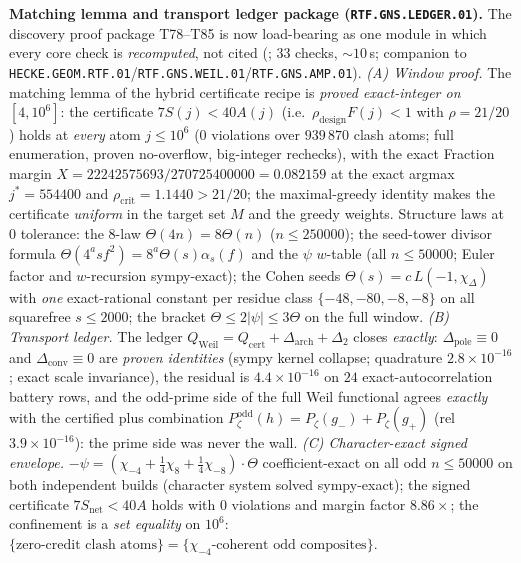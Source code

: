 \par\smallskip\noindent\textbf{Matching lemma and transport ledger package
(\texttt{RTF.GNS.LEDGER.01}).}
The discovery proof package T78--T85 is now load-bearing as one module in which
every core check is \emph{recomputed}, not cited
(; $33$ checks, $\sim10$\,s; companion to
\texttt{HECKE.GEOM.RTF.01}/\texttt{RTF.GNS.WEIL.01}/\texttt{RTF.GNS.AMP.01}).
\emph{(A) Window proof.} The matching lemma of the hybrid certificate recipe is
\emph{proved exact-integer on $[4,10^6]$}: the certificate $7S(j)<40A(j)$
(i.e.\ $\rho_{\mathrm{design}}F(j)<1$ with $\rho=21/20$) holds at \emph{every}
atom $j\le10^6$ ($0$ violations over $939\,870$ clash atoms; full enumeration,
proven no-overflow, big-integer rechecks), with the exact Fraction margin
$X=22242575693/270725400000=0.082159$ at the exact argmax $j^*=554400$ and
$\rho_{\mathrm{crit}}=1.1440>21/20$; the maximal-greedy identity makes the
certificate \emph{uniform} in the target set $M$ and the greedy weights.
Structure laws at $0$ tolerance: the $8$-law $\Theta(4n)=8\Theta(n)$
($n\le250000$); the seed-tower divisor formula
$\Theta(4^asf^2)=8^a\Theta(s)\alpha_s(f)$ and the $\psi$ $w$-table (all
$n\le50000$; Euler factor and $w$-recursion sympy-exact); the Cohen seeds
$\Theta(s)=c\,L(-1,\chi_\Delta)$ with \emph{one} exact-rational constant per
residue class $\{-48,-80,-8,-8\}$ on all squarefree $s\le2000$; the bracket
$\Theta\le2|\psi|\le3\Theta$ on the full window.
\emph{(B) Transport ledger.} The ledger
$Q_{\mathrm{Weil}}=Q_{\mathrm{cert}}+\Delta_{\mathrm{arch}}+\Delta_2$ closes
\emph{exactly}: $\Delta_{\mathrm{pole}}\equiv0$ and $\Delta_{\mathrm{conv}}\equiv0$
are \emph{proven identities} (sympy kernel collapse; quadrature
$2.8\times10^{-16}$; exact scale invariance), the residual is
$4.4\times10^{-16}$ on $24$ exact-autocorrelation battery rows, and the
odd-prime side of the full Weil functional agrees \emph{exactly} with the
certified plus combination
$P_\zeta^{\mathrm{odd}}(h)=P_\zeta(g_-)+P_\zeta(g_+)$
(rel $3.9\times10^{-16}$): the prime side was never the wall.
\emph{(C) Character-exact signed envelope.}
$-\psi=(\chi_{-4}+\tfrac14\chi_8+\tfrac14\chi_{-8})\cdot\Theta$
coefficient-exact on all odd $n\le50000$ on both independent builds
(character system solved sympy-exact); the signed certificate
$7S_{\mathrm{net}}<40A$ holds with $0$ violations and margin factor
$8.86\times$; the confinement is a \emph{set equality} on $10^6$:
$\{\text{zero-credit clash atoms}\}=\{\chi_{-4}\text{-coherent odd composites}\}$.
